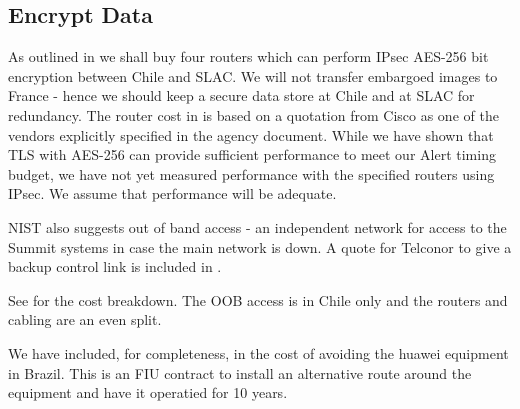 \subsection{Encrypt Data} \label{sec:1encrypt}

As outlined in   we shall buy four routers which can perform IPsec AES-256 bit encryption between Chile and SLAC.
We will not transfer embargoed images to France - hence we should keep a secure data store at Chile and at SLAC for redundancy.
The router cost in   is based on a quotation from Cisco as one of the vendors explicitly specified in the agency document.
While we have shown that TLS with AES-256 can provide sufficient performance to meet our Alert timing budget, we have not yet measured performance with the specified routers using IPsec.
We assume that performance will be adequate.

NIST also suggests out of band access - an independent network for access to the Summit systems in case the main network is down.
A quote for Telconor to give a backup control link is included in .

See  for the cost breakdown.  The OOB access is in Chile only and the routers and cabling are an even split.

We have included, for completeness, in  the cost of avoiding the huawei equipment in Brazil. This is an FIU contract to install an alternative route around the equipment and have it operatied for 10 years.



